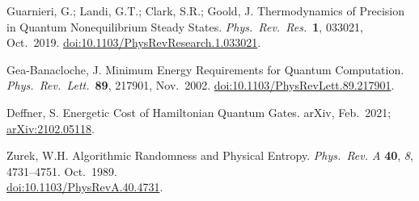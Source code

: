 \documentclass[preprints,article,accept,moreauthors,pdftex]{Definitions/mdpi}
\begin{document}
\begin{thebibliography}{999}
Guarnieri, G.; Landi, G.T.; Clark, S.R.; Goold, J\@. Thermodynamics of Precision in Quantum Nonequilibrium Steady States. {\em Phys.\ Rev.\ Res.}\ {\bf 1}, 033021, Oct.\ 2019. \href{https://doi.org/10.1103/PhysRevResearch.1.033021}{doi:10.1103/PhysRevResearch.1.033021}.

Gea-Banacloche, J\@. Minimum Energy Requirements for Quantum Computation. {\em Phys.\ Rev.\ Lett.}\ {\bf 89}, 217901, Nov.\ 2002. \href{https://doi.org/10.1103/PhysRevLett.89.217901}{doi:10.1103/PhysRevLett.89.217901}.

Deffner, S\@. Energetic Cost of Hamiltonian Quantum Gates. arXiv, Feb.\ 2021; \href{https://arxiv.org/abs/2102.05118}{arXiv:2102.05118}.

Zurek, W.H\@. Algorithmic Randomness and Physical Entropy. {\em Phys.\ Rev. A} {\bf 40}, {\em 8}, 4731--4751. Oct.\ 1989.
\\[0pt]
\href{https://doi.org/10.1103/PhysRevA.40.4731}{doi:10.1103/PhysRevA.40.4731}.







\end{thebibliography}
\end{document}
